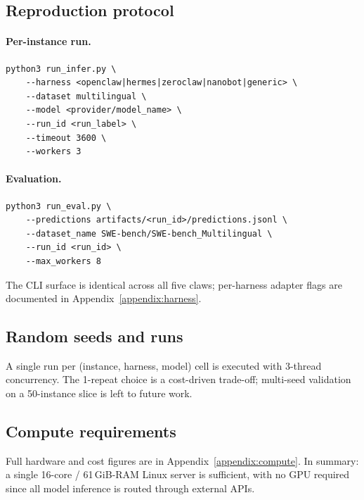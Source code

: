 \subsection{Reproduction protocol}

\paragraph{Per-instance run.}
\begin{verbatim}
python3 run_infer.py \
    --harness <openclaw|hermes|zeroclaw|nanobot|generic> \
    --dataset multilingual \
    --model <provider/model_name> \
    --run_id <run_label> \
    --timeout 3600 \
    --workers 3
\end{verbatim}

\paragraph{Evaluation.}
\begin{verbatim}
python3 run_eval.py \
    --predictions artifacts/<run_id>/predictions.jsonl \
    --dataset_name SWE-bench/SWE-bench_Multilingual \
    --run_id <run_id> \
    --max_workers 8
\end{verbatim}

The CLI surface is identical across all five claws; per-harness adapter flags are documented in Appendix~\ref{appendix:harness}.

\subsection{Random seeds and runs}

A single run per (instance, harness, model) cell is executed with 3-thread concurrency. The 1-repeat choice is a cost-driven trade-off; multi-seed validation on a 50-instance slice is left to future work.

\subsection{Compute requirements}

Full hardware and cost figures are in Appendix~\ref{appendix:compute}. In summary: a single 16-core / 61\,GiB-RAM Linux server is sufficient, with no GPU required since all model inference is routed through external APIs.
